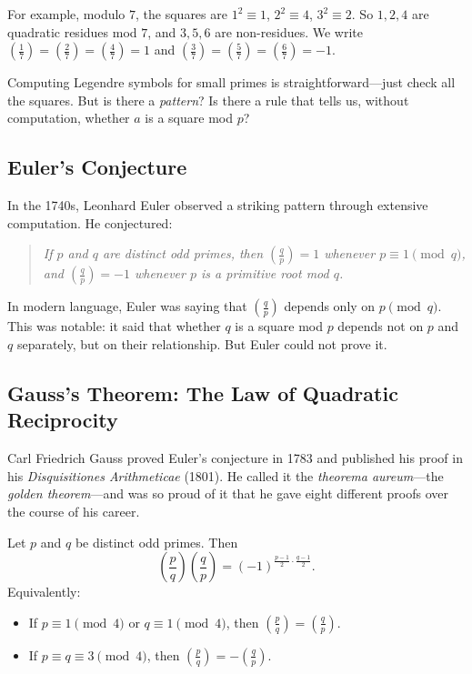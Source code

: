 For example, modulo $7$, the squares are $1^2 \equiv 1$, $2^2 \equiv 4$, $3^2 \equiv 2$. So $1, 2, 4$ are quadratic residues mod $7$, and $3, 5, 6$ are non-residues. We write $\left(\frac{1}{7}\right) = \left(\frac{2}{7}\right) = \left(\frac{4}{7}\right) = 1$ and $\left(\frac{3}{7}\right) = \left(\frac{5}{7}\right) = \left(\frac{6}{7}\right) = -1$.

Computing Legendre symbols for small primes is straightforward---just check all the squares. But is there a \emph{pattern}? Is there a rule that tells us, without computation, whether $a$ is a square mod $p$?

\subsection{Euler's Conjecture}

In the 1740s, Leonhard Euler observed a striking pattern through extensive computation. He conjectured:

\begin{quote}
\emph{If $p$ and $q$ are distinct odd primes, then $\left(\frac{q}{p}\right) = 1$ whenever $p \equiv 1 \pmod{q}$, and $\left(\frac{q}{p}\right) = -1$ whenever $p$ is a primitive root mod $q$.}
\end{quote}

In modern language, Euler was saying that $\left(\frac{q}{p}\right)$ depends only on $p \pmod{q}$. This was notable: it said that whether $q$ is a square mod $p$ depends not on $p$ and $q$ separately, but on their relationship. But Euler could not prove it.

\subsection{Gauss's Theorem: The Law of Quadratic Reciprocity}

Carl Friedrich Gauss proved Euler's conjecture in 1783 and published his proof in his \emph{Disquisitiones Arithmeticae} (1801). He called it the \emph{theorema aureum}---the \emph{golden theorem}---and was so proud of it that he gave eight different proofs over the course of his career.

\begin{theorem}\label{thm:quadratic-reciprocity}
Let $p$ and $q$ be distinct odd primes. Then
\[
    \left(\frac{p}{q}\right)\left(\frac{q}{p}\right) = (-1)^{\frac{p-1}{2} \cdot \frac{q-1}{2}}.
\]
Equivalently:
\begin{itemize}
    \item If $p \equiv 1 \pmod{4}$ or $q \equiv 1 \pmod{4}$, then $\left(\frac{p}{q}\right) = \left(\frac{q}{p}\right)$.
    \item If $p \equiv q \equiv 3 \pmod{4}$, then $\left(\frac{p}{q}\right) = -\left(\frac{q}{p}\right)$.
\end{itemize}
\end{theorem}

